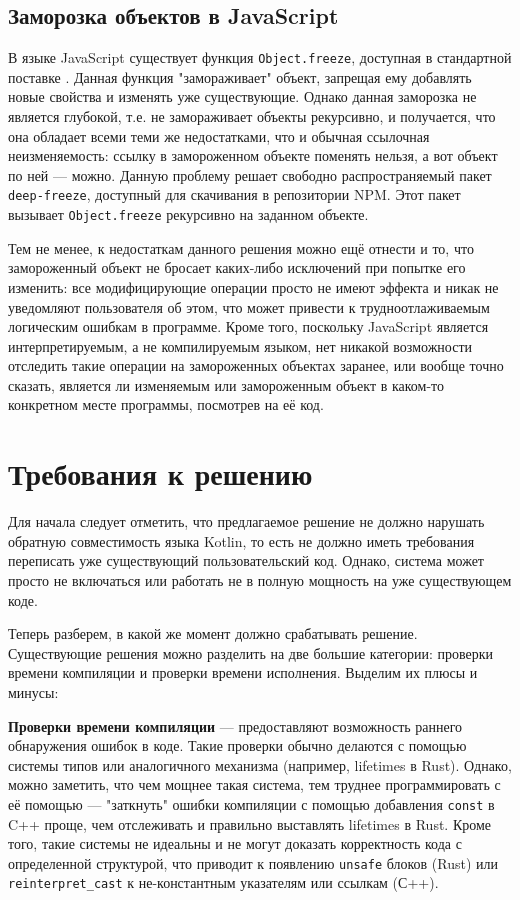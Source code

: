 \documentclass[specification,annotation,times]{itmo-student-thesis}
\begin{document}
\subsection{Заморозка объектов в JavaScript}\label{js_freeze}

В языке JavaScript существует функция \texttt{Object.freeze}, доступная в стандартной поставке \cite{EcmaScript}. Данная функция "замораживает" объект, запрещая ему добавлять новые свойства и изменять уже существующие.
Однако данная заморозка не является глубокой, т.е. не замораживает объекты рекурсивно, и получается, что она обладает всеми теми же недостатками, что и обычная ссылочная неизменяемость: ссылку в замороженном объекте поменять нельзя, а вот объект по ней --- можно.
Данную проблему решает свободно распространяемый пакет \texttt{deep-freeze}, доступный для скачивания в репозитории NPM\cite{js-deep-freeze}. Этот пакет вызывает \texttt{Object.freeze} рекурсивно на заданном объекте.

Тем не менее, к недостаткам данного решения можно ещё отнести и то, что замороженный объект не бросает каких-либо исключений при попытке его изменить: все модифицирующие операции просто не имеют эффекта и никак не уведомляют пользователя об этом, что может привести к трудноотлаживаемым логическим ошибкам в программе. Кроме того, поскольку JavaScript является интерпретируемым, а не компилируемым языком, нет никакой возможности отследить такие операции на замороженных объектах заранее, или вообще точно сказать, является ли изменяемым или замороженным объект в каком-то конкретном месте программы, посмотрев на её код.

\section{Требования к решению}

Для начала следует отметить, что предлагаемое решение не должно нарушать обратную совместимость языка Kotlin, то есть не должно иметь требования переписать уже существующий пользовательский код. Однако, система может просто не включаться или работать не в полную мощность на уже существующем коде.

Теперь разберем, в какой же момент должно срабатывать решение. Существующие решения можно разделить на две большие категории: проверки времени компиляции и проверки времени исполнения.
Выделим их плюсы и минусы:

\textbf{Проверки времени компиляции} --- предоставляют возможность раннего обнаружения ошибок в коде. Такие проверки обычно делаются с помощью системы типов или аналогичного механизма (например, lifetimes в Rust).
Однако, можно заметить, что чем мощнее такая система, тем труднее программировать с её помощью --- "заткнуть" ошибки компиляции с помощью добавления \texttt{const} в C++ проще, чем отслеживать и правильно выставлять lifetimes в Rust.
Кроме того, такие системы не идеальны и не могут доказать корректность кода с определенной структурой, что приводит к появлению \texttt{unsafe} блоков (Rust) или \texttt{reinterpret\_cast} к не-константным указателям или ссылкам (С++).
\end{document}
